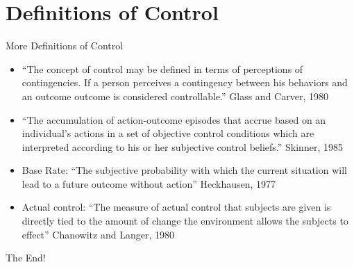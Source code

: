 \documentclass{beamer}
\begin{document}
\section{Definitions of Control}
\begin{frame}[label=morecontroldefs]{More Definitions of Control}
\begin{itemize}
\item ``The concept of control may be defined in terms of perceptions of contingencies.  If a person perceives a contingency between his behaviors and an outcome \textellipsis outcome is considered controllable.''  \textemdash Glass and Carver, 1980
\item ``The accumulation of action-outcome episodes that accrue based on an individual's actions in a set of objective control conditions which are interpreted according to his or her subjective control beliefs.'' \textemdash Skinner, 1985
\item Base Rate: ``The subjective probability with which the current situation will lead to a future outcome without action'' \textemdash Heckhausen, 1977
\item Actual control: ``The measure of actual control that subjects are given is directly tied to the amount of change the environment allows the subjects to effect'' \textemdash Chanowitz and Langer, 1980
\end{itemize}
\end{frame}

\begin{frame}
The End!
\end{frame}
\end{document}
